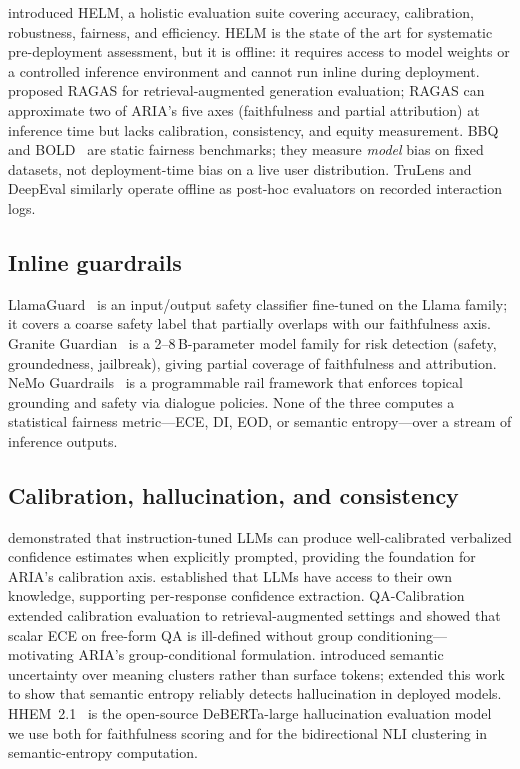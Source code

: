 \documentclass{article}
\begin{document}
\citet{liang2022helm} introduced HELM, a holistic evaluation suite
covering accuracy, calibration, robustness, fairness, and efficiency.
HELM is the state of the art for systematic pre-deployment assessment, but
it is offline: it requires access to model weights or a controlled
inference environment and cannot run inline during deployment.
\citet{es2023ragas} proposed RAGAS for retrieval-augmented generation
evaluation; RAGAS can approximate two of ARIA's five axes (faithfulness
and partial attribution) at inference time but lacks calibration,
consistency, and equity measurement.
BBQ~\citep{parrish2022bbq} and BOLD~\citep{dhamala2021bold} are static
fairness benchmarks; they measure \emph{model} bias on fixed datasets, not
deployment-time bias on a live user distribution.
TruLens and DeepEval similarly operate offline as post-hoc evaluators on
recorded interaction logs.

\subsection{Inline guardrails}

LlamaGuard~\citep{inan2023llamaguard} is an input/output safety classifier
fine-tuned on the Llama family; it covers a coarse safety label that
partially overlaps with our faithfulness axis.
Granite Guardian~\citep{padhi2024graniteguardian} is a 2--8\,B-parameter
model family for risk detection (safety, groundedness, jailbreak), giving
partial coverage of faithfulness and attribution.
NeMo Guardrails~\citep{nvidia2023nemo} is a programmable rail framework
that enforces topical grounding and safety via dialogue policies.
None of the three computes a statistical fairness metric---ECE, DI, EOD,
or semantic entropy---over a stream of inference outputs.

\subsection{Calibration, hallucination, and consistency}

\citet{tian2023justask} demonstrated that instruction-tuned LLMs can
produce well-calibrated verbalized confidence estimates when explicitly
prompted, providing the foundation for ARIA's calibration axis.
\citet{kadavath2022language} established that LLMs have access to their
own knowledge, supporting per-response confidence extraction.
QA-Calibration~\citep{qacalibration2025} extended calibration evaluation
to retrieval-augmented settings and showed that scalar ECE on free-form
QA is ill-defined without group conditioning---motivating ARIA's
group-conditional formulation.
\citet{kuhn2023semantic} introduced semantic uncertainty over meaning
clusters rather than surface tokens; \citet{farquhar2024nature} extended
this work to show that semantic entropy reliably detects hallucination in
deployed models.
HHEM~2.1~\citep{vectara2024hhem} is the open-source DeBERTa-large
hallucination evaluation model we use both for faithfulness scoring and
for the bidirectional NLI clustering in semantic-entropy computation.
\end{document}
